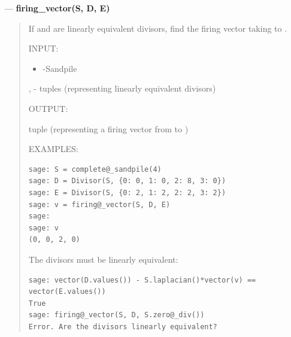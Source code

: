 \documentclass[letterpaper,10pt,english]{manual}
\begin{document}
---
\hypertarget{firing-vector-s-d-e}{}
\textbf{firing\_vector(S, D, E)}
\begin{quote}

If  and  are linearly equivalent divisors, find the firing vector
taking  to .

INPUT:
\begin{itemize}
\item {} 
 -Sandpile

\end{itemize}

,  - tuples (representing linearly equivalent divisors)

OUTPUT:

tuple (representing a firing vector from  to )

EXAMPLES:

\begin{Verbatim}[commandchars=@\[\]]
sage: S = complete@_sandpile(4)
sage: D = Divisor(S, {0: 0, 1: 0, 2: 8, 3: 0})
sage: E = Divisor(S, {0: 2, 1: 2, 2: 2, 3: 2})
sage: v = firing@_vector(S, D, E)
sage:
sage: v
(0, 0, 2, 0)
\end{Verbatim}

The divisors must be linearly equivalent:

\begin{Verbatim}[commandchars=@\[\]]
sage: vector(D.values()) - S.laplacian()*vector(v) == vector(E.values())
True
sage: firing@_vector(S, D, S.zero@_div())
Error. Are the divisors linearly equivalent?
\end{Verbatim}
\end{quote}
\end{document}
